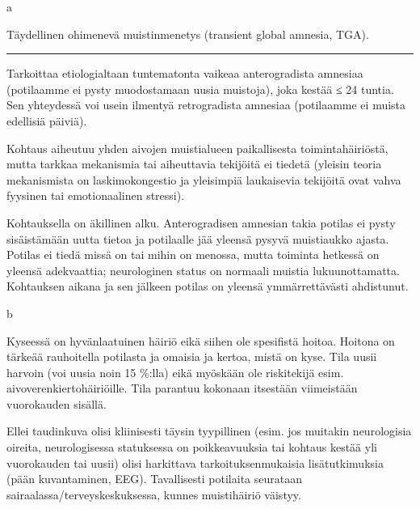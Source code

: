 \documentclass[
]{book}
\begin{document}
a

Täydellinen ohimenevä muistinmenetys (transient global amnesia, TGA).

\begin{center}\rule{0.5\linewidth}{0.5pt}\end{center}

Tarkoittaa etiologialtaan tuntematonta vaikeaa anterogradista amnesiaa (potilaamme ei pysty muodostamaan uusia muistoja), joka kestää ≤ 24 tuntia. Sen yhteydessä voi usein ilmentyä retrogradista amnesiaa (potilaamme ei muista edellisiä päiviä).

Kohtaus aiheutuu yhden aivojen muistialueen paikallisesta toimintahäiriöstä, mutta tarkkaa mekanismia tai aiheuttavia tekijöitä ei tiedetä (yleisin teoria mekanismista on laskimokongestio ja yleisimpiä laukaisevia tekijöitä ovat vahva fyysinen tai emotionaalinen stressi).

Kohtauksella on äkillinen alku. Anterogradisen amnesian takia potilas ei pysty sisäistämään uutta tietoa ja potilaalle jää yleensä pysyvä muistiaukko ajasta. Potilas ei tiedä missä on tai mihin on menossa, mutta toiminta hetkessä on yleensä adekvaattia; neurologinen status on normaali muistia lukuunottamatta. Kohtauksen aikana ja sen jälkeen potilas on yleensä ymmärrettävästi ahdistunut.

b

Kyseessä on hyvänlaatuinen häiriö eikä siihen ole spesifistä hoitoa. Hoitona on tärkeää rauhoitella potilasta ja omaisia ja kertoa, mistä on kyse. Tila uusii harvoin (voi uusia noin 15 \%:lla) eikä myöskään ole riskitekijä esim. aivoverenkiertohäiriöille. Tila parantuu kokonaan itsestään viimeistään vuorokauden sisällä.

Ellei taudinkuva olisi kliinisesti täysin tyypillinen (esim. jos muitakin neurologisia oireita, neurologisessa statuksessa on poikkeavuuksia tai kohtaus kestää yli vuorokauden tai uusii) olisi harkittava tarkoituksenmukaisia lisätutkimuksia (pään kuvantaminen, EEG). Tavallisesti potilaita seurataan sairaalassa/terveyskeskuksessa, kunnes muistihäiriö väistyy.
\end{document}
